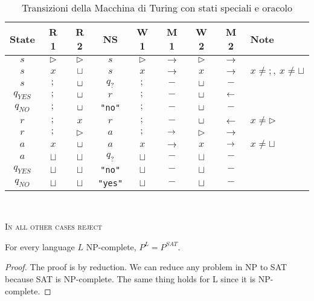\begin{table}[ht]
\begin{center}
\renewcommand{\arraystretch}{1.2}
\begin{tabular}{|c|c|c|c|c|c|c|c|l|}
\hline
\textbf{State} & \textbf{R 1} & \textbf{R 2} & \textbf{NS} & \textbf{W 1} & \textbf{M 1} & \textbf{W 2} & \textbf{M 2} & \textbf{Note} \\
\hline
$s$ & $\triangleright$ & $\triangleright$ & $s$ & $\triangleright$ & $\rightarrow$ & $\triangleright$ & $\rightarrow$ & \\
$s$ & $x$ & $\sqcup$ & $s$ & $x$ & $\rightarrow$ & $x$ & $\rightarrow$ & $x \neq ;,\ x \neq \sqcup$ \\
$s$ & $;$ & $\sqcup$ & $q_?$ & $;$ & $-$ & $\sqcup$ & $-$ & \\
$q_{YES}$ & $;$ & $\sqcup$ & $r$ & $;$ & $-$ & $\sqcup$ & $\leftarrow$ & \\
$q_{NO}$ & $;$ & $\sqcup$ & \texttt{"no"} & $;$ & $-$ & $\sqcup$ & $-$ & \\
$r$ & $;$ & $x$ & $r$ & $;$ & $-$ & $\sqcup$ & $\leftarrow$ & $x \neq \triangleright$ \\  
$r$ & $;$ & $\triangleright$ & $a$ & $;$ & $\rightarrow$ & $\triangleright$ & $\rightarrow$ & \\
$a$ & $x$ & $\sqcup$ & $a$ & $x$ & $\rightarrow$ & $x$ & $\rightarrow$ & $x \neq \sqcup$ \\
$a$ & $\sqcup$ & $\sqcup$ & $q_?$ & $\sqcup$ & $-$ & $\sqcup$ & $-$ & \\
$q_{YES}$ & $\sqcup$ & $\sqcup$ & \texttt{"no"} & $\sqcup$ & $-$ & $\sqcup$ & $-$ & \\
$q_{NO}$ & $\sqcup$ & $\sqcup$ & \texttt{"yes"} & $\sqcup$ & $-$ & $\sqcup$ & $-$ &  \\
\hline
\end{tabular}
\\
\end{center}
\textsc{In all other cases reject}
\caption{Transizioni della Macchina di Turing con stati speciali e oracolo}
\end{table}
\newpage
\begin{defbox}[Proposition]
  For every language $L$ \textsc{NP}-complete, $P^L=P^{SAT}$.
\end{defbox}
\begin{proof}
  The proof is by reduction. We can reduce any problem in \textsc{NP} to \textsc{SAT} because \textsc{SAT} is \textsc{NP}-complete. The same thing holds for \textsc{L} since it is \textsc{NP}-complete.
\end{proof}
